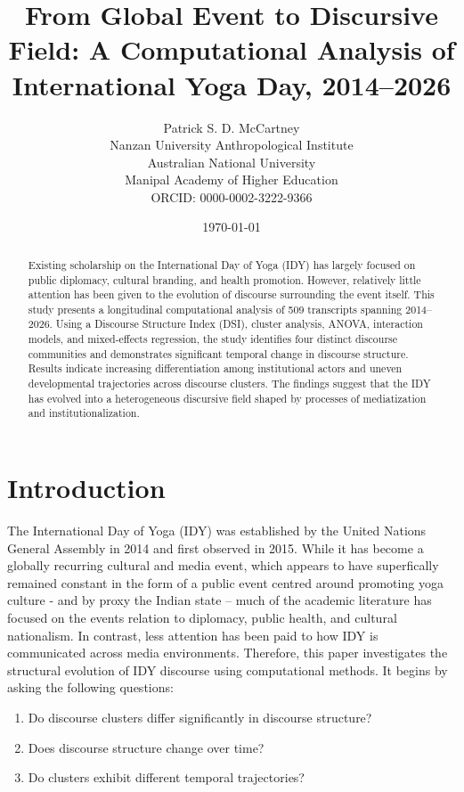 \documentclass[11pt]{article}
\title{From Global Event to Discursive Field: A Computational Analysis of International Yoga Day, 2014--2026}
\author{

Patrick S. D. McCartney\\

Nanzan University Anthropological Institute\\

Australian National University\\

Manipal Academy of Higher Education\\

ORCID: 0000-0002-3222-9366

}
\date{\today}
\begin{document}
\maketitle



\begin{abstract}



Existing scholarship on the International Day of Yoga (IDY) has largely focused on public diplomacy, cultural branding,
and health promotion. However, relatively little attention has been given to the evolution of discourse surrounding the
event itself. This study presents a longitudinal computational analysis of 509 transcripts spanning 2014--2026. Using a
Discourse Structure Index (DSI), cluster analysis, ANOVA, interaction models, and mixed-effects regression, the study
identifies four distinct discourse communities and demonstrates significant temporal change in discourse structure.
Results indicate increasing differentiation among institutional actors and uneven developmental trajectories across
discourse clusters. The findings suggest that the IDY has evolved into a heterogeneous discursive field shaped by
processes of mediatization and institutionalization.


\end{abstract}



\section{Introduction}



The International Day of Yoga (IDY) was established by the United Nations General Assembly in 2014 and first observed in
2015. While it has become a globally recurring cultural and media event, which appears to have superfically remained
constant in the form of a public event centred around promoting yoga culture - and by proxy the Indian state – much of
the academic literature has focused on the events relation to diplomacy, public health, and cultural nationalism. In
contrast, less attention has been paid to how IDY is communicated across media environments. Therefore, this paper
investigates the structural evolution of IDY discourse using computational methods. It begins by asking the following
questions:


\begin{enumerate}

\item Do discourse clusters differ significantly in discourse structure?

\item Does discourse structure change over time?

\item Do clusters exhibit different temporal trajectories?

\end{enumerate}
\end{document}
